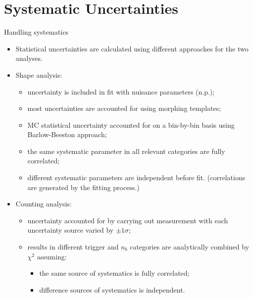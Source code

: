 \section{Systematic Uncertainties}



\begin{frame}{Handling systematics}

    \begin{itemize}
        \item Statistical uncertainties are calculated using different approaches for the two analyses.
        \item Shape analysis:
        \begin{itemize}
            \smaller
            \item uncertainty is included in fit with nuisance parameters (n.p.);
            \item most uncertainties are accounted for using morphing templates;
            \item MC statistical uncertainty accounted for on a bin-by-bin basis using Barlow-Beeston approach;
            \item the same systematic parameter in all relevant categories are fully correlated;
            \item different systematic parameters are independent before fit. (correlations are generated by the fitting process.)
        \end{itemize}
        
        \item Counting analysis:
        \begin{itemize}
            \smaller
            \item uncertainty accounted for by carrying out measurement with each uncertainty source varied by $\pm 1\sigma$;
            \item results in different trigger and $n_b$ categories are analytically combined by $\chi^2$ assuming:
            \begin{itemize}
            \smaller 
                \item the same source of systematics is fully correlated;
                \item difference sources of systematics is independent.
            \end{itemize}
        \end{itemize}
    \end{itemize}

\end{frame}


